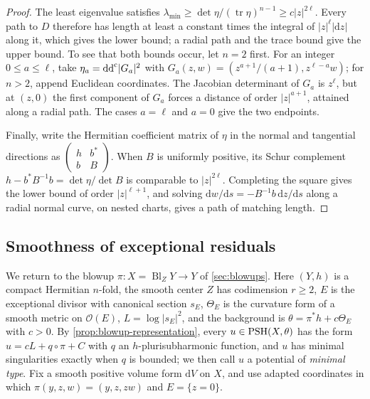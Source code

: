 \begin{proof}
The least eigenvalue satisfies $\lambda_{\min}\geq\det\eta/(\operatorname{tr}\eta)^{n-1}\geq c|z|^{2\ell}$. Every path to $D$ therefore has length at least a constant times the integral of $|z|^\ell|\mathrm{d} z|$ along it, which gives the lower bound; a radial path and the trace bound give the upper bound. To see that both bounds occur, let $n=2$ first. For an integer $0\leq a\leq\ell$, take $\eta_a=\mathrm{dd}^{\mathrm{c}}|G_a|^2$ with $G_a(z,w)=(z^{a+1}/(a+1),z^{\ell-a}w)$; for $n>2$, append Euclidean coordinates. The Jacobian determinant of $G_a$ is $z^\ell$, but at $(z,0)$ the first component of $G_a$ forces a distance of order $|z|^{a+1}$, attained along a radial path. The cases $a=\ell$ and $a=0$ give the two endpoints.

Finally, write the Hermitian coefficient matrix of $\eta$ in the normal and tangential directions as $\left(\begin{smallmatrix}h&b^*\\b&B\end{smallmatrix}\right)$. When $B$ is uniformly positive, its Schur complement $h-b^*B^{-1}b=\det\eta/\det B$ is comparable to $|z|^{2\ell}$. Completing the square gives the lower bound of order $|z|^{\ell+1}$, and solving $\mathrm{d} w/\mathrm{d} s=-B^{-1}b\,\mathrm{d} z/\mathrm{d} s$ along a radial normal curve, on nested charts, gives a path of matching length.
\end{proof}

\subsection{Smoothness of exceptional residuals}

We return to the blowup $\pi\colon X=\operatorname{Bl}_Z Y\to Y$ of \cref{sec:blowups}. Here $(Y,h)$ is a compact Hermitian $n$-fold, the smooth center $Z$ has codimension $r\geq2$, $E$ is the exceptional divisor with canonical section $s_E$, $\Theta_E$ is the curvature form of a smooth metric on $\mathcal O(E)$, $L=\log|s_E|^2$, and the background is $\theta=\pi^*h+c\Theta_E$ with $c>0$. By \cref{prop:blowup-representation}, every $u\in\mathrm{PSH}(X,\theta)$ has the form $u=cL+q\circ\pi+C$ with $q$ an $h$-plurisubharmonic function, and $u$ has minimal singularities exactly when $q$ is bounded; we then call $u$ a potential of \emph{minimal type}. Fix a smooth positive volume form $\mathrm{d}V$ on $X$, and use adapted coordinates in which $\pi(y,z,w)=(y,z,zw)$ and $E=\{z=0\}$.

